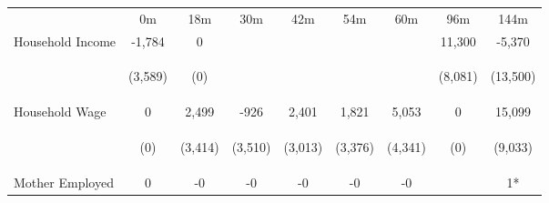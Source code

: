 \begin{tabular}{lcccccccc}
\hline \noalign{\smallskip} & 0m & 18m & 30m & 42m & 54m & 60m & 96m & 144m\\
\noalign{\smallskip}\hline \noalign{\smallskip}Household Income & -1,784 & 0 &  &  &  &  & 11,300 & -5,370\\
 & \begin{footnotesize}(3,589)\end{footnotesize} & \begin{footnotesize}(0)\end{footnotesize} & \begin{footnotesize}\end{footnotesize} & \begin{footnotesize}\end{footnotesize} & \begin{footnotesize}\end{footnotesize} & \begin{footnotesize}\end{footnotesize} & \begin{footnotesize}(8,081)\end{footnotesize} & \begin{footnotesize}(13,500)\end{footnotesize}\\
\noalign{\smallskip}Household Wage & 0 & 2,499 & -926 & 2,401 & 1,821 & 5,053 & 0 & 15,099\\
 & \begin{footnotesize}(0)\end{footnotesize} & \begin{footnotesize}(3,414)\end{footnotesize} & \begin{footnotesize}(3,510)\end{footnotesize} & \begin{footnotesize}(3,013)\end{footnotesize} & \begin{footnotesize}(3,376)\end{footnotesize} & \begin{footnotesize}(4,341)\end{footnotesize} & \begin{footnotesize}(0)\end{footnotesize} & \begin{footnotesize}(9,033)\end{footnotesize}\\
\noalign{\smallskip}Mother Employed & 0 & -0 & -0 & -0 & -0 & -0 &  & 1*\\

\end{tabular}
